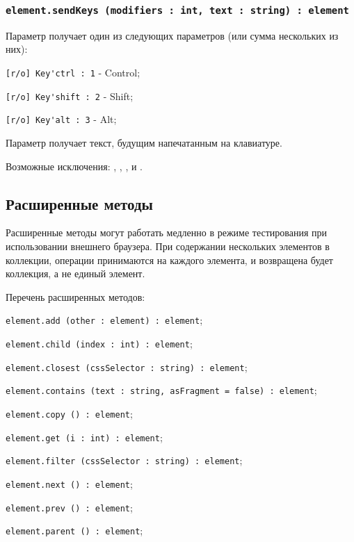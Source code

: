 \subsubsection{\lstinline|element.sendKeys (modifiers : int, text : string) : element|}

Параметр  получает один из следующих параметров (или сумма нескольких из них):
\begin{icItems}
	\item \lstinline|[r/o] Key'ctrl : 1| - Control;
	\item \lstinline|[r/o] Key'shift : 2| - Shift;
	\item \lstinline|[r/o] Key'alt : 3| - Alt;
\end{icItems}

Параметр  получает текст, будущим напечатанным на клавиатуре.

Возможные исключения: , , ,   и .

\subsection{Расширенные методы}

Расширенные методы могут работать медленно в режиме тестирования при использовании внешнего браузера. При содержании нескольких элементов в коллекции, операции принимаются на каждого элемента, и возвращена будет коллекция, а не единый элемент.

Перечень расширенных методов:
\begin{icItems}
    \item \lstinline|element.add (other : element) : element|;
	\item \lstinline|element.child (index : int) : element|;
	\item \lstinline|element.closest (cssSelector : string) : element|;
	\item \lstinline|element.contains (text : string, asFragment = false) : element|;
	\item \lstinline|element.copy () : element|;
	\item \lstinline|element.get (i : int) : element|;
	\item \lstinline|element.filter (cssSelector : string) : element|;
	\item \lstinline|element.next () : element|;
	\item \lstinline|element.prev () : element|;
	\item \lstinline|element.parent () : element|;
\end{icItems}

